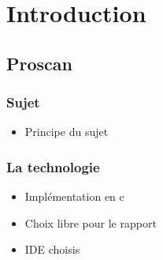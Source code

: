 \section{Introduction}

\subsection{Proscan}
\begin{frame}
    \frametitle{\textbf{Sujet}}
	\begin{itemize}
	\item Principe du sujet

	\end{itemize}
\end{frame}

\begin{frame}
    \frametitle{\textbf{La technologie}}
	
	\begin{itemize}
	 \item Implémentation en c
	 \item Choix libre pour le rapport
	 \item IDE choisis
	\end{itemize}
\end{frame}

